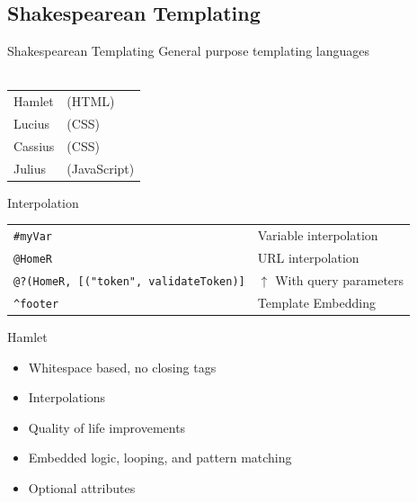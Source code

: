 \documentclass[pdf]{beamer}
\begin{document}
\subsection{Shakespearean Templating}
\begin{frame}{Shakespearean Templating}
  General purpose templating languages\\
  \\
  \begin{tabular}{ l l }
    Hamlet  & (HTML)\\
    Lucius  & (CSS)\\
    Cassius & (CSS)\\
    Julius  & (JavaScript)\\
  \end{tabular}
\end{frame}

\begin{frame}[fragile]{Interpolation}
  \begin{tabular} { l l }
    \texttt{#{myVar}}                               & Variable interpolation \\
    \pause
    \texttt{@{HomeR}}                               & URL interpolation \\
    \pause
    \texttt{@?{(HomeR, [("token", validateToken)]}} & $\uparrow$ With query parameters \\
    \pause
    \texttt{^{footer}}                              & Template Embedding\\
  \end{tabular}
\end{frame}

\begin{frame}{Hamlet}
  \begin{itemize}
  \item<1-> Whitespace based, no closing tags\\
  \item<2-> Interpolations\\
  \item<3-> Quality of life improvements\\
  \item<4-> Embedded logic, looping, and pattern matching \\
  \item<5-> Optional attributes\\
  \end{itemize}
\end{frame}
\end{document}
